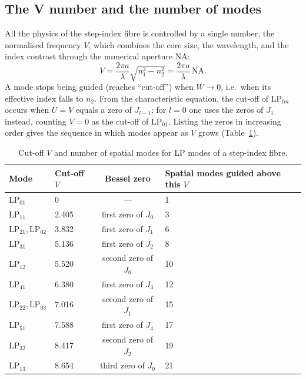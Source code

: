\documentclass[11pt,a4paper]{article}
\begin{document}
\subsection{The V number and the number of modes}
All the physics of the step-index fibre is controlled by a single number, the normalised frequency $V$, which combines the core size, the wavelength, and the index contrast through the numerical aperture NA:
\begin{equation}
V = \frac{2\pi a}{\lambda}\sqrt{n_1^2 - n_2^2} = \frac{2\pi a}{\lambda}\,\mathrm{NA}.
\label{eq:V}
\end{equation}
A mode stops being guided (reaches ``cut-off'') when $W \to 0$, i.e.\ when its effective index falls to $n_2$. From the characteristic equation, the cut-off of $\mathrm{LP}_{lm}$ occurs when $U = V$ equals a zero of $J_{l-1}$; for $l = 0$ one uses the zeros of $J_1$ instead, counting $V = 0$ as the cut-off of $\mathrm{LP}_{01}$. Listing the zeros in increasing order gives the sequence in which modes appear as $V$ grows (Table~\ref{tab:modes}).

\begin{table}[h]
\centering
\caption{Cut-off $V$ and number of spatial modes for LP modes of a step-index fibre.}
\label{tab:modes}
\begin{tabular}{@{}llcl@{}}
\toprule
Mode & Cut-off $V$ & Bessel zero & Spatial modes guided above this $V$ \\
\midrule
$\mathrm{LP}_{01}$ & 0 & --- & 1 \\
$\mathrm{LP}_{11}$ & 2.405 & first zero of $J_0$ & 3 \\
$\mathrm{LP}_{21},\mathrm{LP}_{02}$ & 3.832 & first zero of $J_1$ & 6 \\
$\mathrm{LP}_{31}$ & 5.136 & first zero of $J_2$ & 8 \\
$\mathrm{LP}_{12}$ & 5.520 & second zero of $J_0$ & 10 \\
$\mathrm{LP}_{41}$ & 6.380 & first zero of $J_3$ & 12 \\
$\mathrm{LP}_{22},\mathrm{LP}_{03}$ & 7.016 & second zero of $J_1$ & 15 \\
$\mathrm{LP}_{51}$ & 7.588 & first zero of $J_4$ & 17 \\
$\mathrm{LP}_{32}$ & 8.417 & second zero of $J_2$ & 19 \\
$\mathrm{LP}_{13}$ & 8.654 & third zero of $J_0$ & 21 \\
\bottomrule
\end{tabular}
\end{table}
\end{document}
